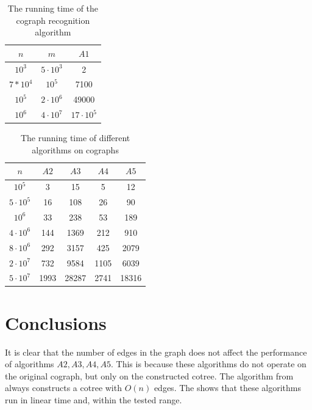   
\begin{table}[ht]
\centering
\begin{tabular}{ | c | c | c |}
\hline
$n$ & $m$ & $A1$    \\ [0.6ex] 
 \hline
 $10^3$ & $5 \cdot 10^3$ & 2  \\ [0.6ex] 
\hline
 $7*10^4$ & $10^5$ & 7100  \\ [0.6ex] 
  \hline
 $10^5$ & $2 \cdot 10^6$ & 49000  \\ [0.6ex] 
 \hline
 $10^6$ & $4 \cdot 10^7$ & $17 \cdot 10^5$  \\ [0.6ex] 
 \hline
\end{tabular}

\caption{The running time of the cograph recognition algorithm}
\label{tbl:algorithms}
\end{table}


\begin{table}[ht]
\centering
\begin{tabular}{ | c | c | c | c | c | }
\hline
$n$ & $A2$ & $A3$ & $A4$ & $A5$   \\ [0.6ex]
\hline
$10^5$ & 3 & 15 & 5 & 12 \\ [0.6ex] 
\hline
$5 \cdot 10^5$ & 16 & 108 & 26 & 90 \\ [0.6ex] 
\hline
$10^6$ & 33 & 238 & 53 & 189 \\ [0.6ex] 
\hline
$4 \cdot 10^6$ & 144 & 1369 & 212 & 910 \\ [0.6ex] 
\hline
$8 \cdot 10^6$ & 292 & 3157 & 425 & 2079 \\ [0.6ex] 
\hline
$2 \cdot 10^7$ & 732 & 9584 & 1105 & 6039 \\ [0.6ex]
\hline
$5 \cdot 10^7$ & 1993 & 28287 & 2741 & 18316 \\ [0.6ex]
\hline

\end{tabular}

\caption{The running time of different algorithms on cographs}
\label{tbl:algorithms1}
\end{table}


\section{Conclusions}

It is clear that the number of edges in the graph does not affect the performance of algorithms $A2, A3, A4, A5$. This is because these algorithms do not operate on the original cograph, but only on the constructed cotree. The algorithm from  always constructs a cotree with $O(n)$ edges. The  shows that these algorithms run in linear time and, within the tested range.

